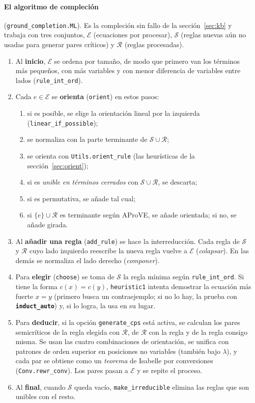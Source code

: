\documentclass[11pt,a4paper]{article}
\newcommand{\isa}[1]{\texttt{#1}}
\newcommand{\cmd}[1]{\textbf{\texttt{#1}}}
\newcommand{\R}{\mathcal{R}}
\newcommand{\E}{\mathcal{E}}
\newcommand{\Sset}{\mathcal{S}}
\theoremstyle{definition}
\theoremstyle{remark}
\begin{document}
\paragraph{El algoritmo de compleción} (\isa{ground\_completion.ML}).
Es la compleción sin fallo de la sección~\ref{sec:kb} y trabaja con tres conjuntos,
$\E$ (ecuaciones por procesar), $\Sset$ (reglas nuevas aún no usadas para generar
pares críticos) y $\R$ (reglas procesadas).
\begin{enumerate}
  \item Al \textbf{inicio}, $\E$ se ordena por tamaño, de modo que primero van los
        términos más pequeños, con más variables y con menor diferencia de
        variables entre lados (\isa{rule\_int\_ord}).
  \item Cada $e \in \E$ se \textbf{orienta} (\isa{orient}) en estos pasos:
    \begin{enumerate}[nosep]
      \item si es posible, se elige la orientación lineal por la izquierda
            (\isa{linear\_if\_possible});
      \item se normaliza con la parte terminante de $\Sset \cup \R$;
      \item se orienta con \isa{Utils.orient\_rule} (las heurísticas de la
            sección~\ref{sec:orient});
      \item si es \emph{unible en términos cerrados} con $\Sset \cup \R$, se descarta;
      \item si es permutativa, se añade tal cual;
      \item si $\{e\} \cup \R$ es terminante según AProVE, se añade orientada; si no,
            se añade girada.
    \end{enumerate}
  \item Al \textbf{añadir una regla} (\isa{add\_rule}) se hace la interreducción. Cada regla de
        $\Sset$ y $\R$ cuyo lado izquierdo reescribe la nueva regla vuelve a $\E$
        (\emph{colapsar}). En las demás se normaliza el lado derecho
        (\emph{componer}).
  \item Para \textbf{elegir} (\isa{choose}) se toma de $\Sset$ la regla mínima según
        \isa{rule\_int\_ord}. Si tiene la forma $c(x) = c(y)$, \isa{heuristic1}
        intenta demostrar la ecuación más fuerte $x = y$ (primero busca un
        contraejemplo; si no lo hay, la prueba con \cmd{induct\_auto}) y, si lo
        logra, la usa en su lugar.
  \item Para \textbf{deducir}, si la opción \isa{generate\_cps} está activa, se calculan los
        pares semicríticos de la regla elegida con $\R$, de $\R$ con la regla y de la
        regla consigo misma. Se usan las cuatro combinaciones de orientación, se
        unifica con patrones de orden superior en posiciones no variables (también
        bajo $\lambda$), y cada par se obtiene como un \emph{teorema} de Isabelle por
        conversiones (\isa{Conv.rewr\_conv}). Los pares pasan a $\E$ y se repite el
        proceso.
  \item Al \textbf{final}, cuando $\Sset$ queda vacío, \isa{make\_irreducible} elimina las
        reglas que son unibles con el resto.
\end{enumerate}
\end{document}
